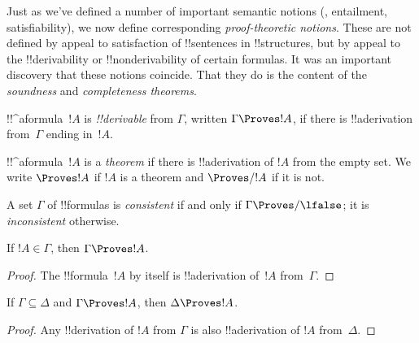 \documentclass[../../../include/open-logic-section]{subfiles}
\begin{document}
      {}
      {}

\begin{explain}
Just as we've defined a number of important semantic notions
(, entailment, satisfiability), we now
define corresponding \emph{proof-theoretic notions}.  These are not
defined by appeal to satisfaction of !!{sentence}s in !!{structure}s,
but by appeal to the !!{derivability} or !!{nonderivability} of
certain formulas.  It was an important discovery that these notions
coincide.  That they do is the content of the \emph{soundness} and
\emph{completeness theorems}.
\end{explain}

\begin{defn}[!!^{derivability}]
!!^a{formula}~$!A$ is \emph{!!{derivable}} from $\Gamma$, written
$\Gamma \Proves !A$, if there is !!a{derivation} from~$\Gamma$ ending
in~$!A$.
\end{defn}

\begin{defn}[Theorems]
!!^a{formula}~$!A$ is a \emph{theorem} if there is !!a{derivation} of
$!A$ from the empty set.  We write $\Proves !A$ if $!A$ is a theorem
and $\Proves/ !A$ if it is not.
\end{defn}

\begin{defn}[Consistency]
A set $\Gamma$ of !!{formula}s is \emph{consistent} if and only if
$\Gamma\Proves/ \lfalse$; it is \emph{inconsistent} otherwise.
\end{defn}

\begin{prop}[Reflexivity]
If $!A \in \Gamma$, then $\Gamma \Proves !A$.
\end{prop}

\begin{proof}
  The !!{formula}~$!A$ by itself is !!a{derivation} of~$!A$ from~$\Gamma$.
\end{proof}

\begin{prop}[Monotonicity]
If $\Gamma \subseteq \Delta$ and $\Gamma \Proves !A$, then $\Delta
\Proves !A$.
\end{prop}

\begin{proof}
Any !!{derivation} of $!A$ from $\Gamma$ is also !!a{derivation} of
$!A$ from~$\Delta$.
\end{proof}
\end{document}
